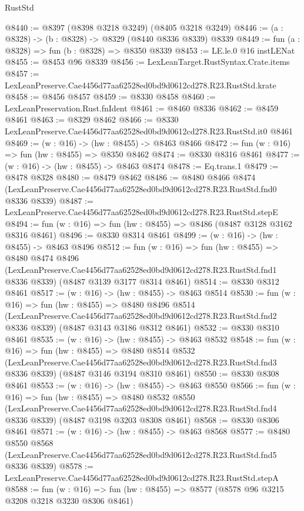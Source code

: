 \begin{lexlean}{RustStd}
\begin{coremodule}
@8440 := @8397 (@8398 @3218 @3249) (@8405 @3218 @3249)
@8446 := (a : @8328) -> (b : @8328) -> @8329 (@8440 @8336 @8339) @8339
@8449 := fun (a : @8328) => fun (b : @8328) => @8350 @8339
@8453 := LE.le.{0} @16 instLENat
@8455 := @8453 @96 @8339
@8456 := LexLeanTarget.RustSyntax.Crate.items
@8457 := LexLeanPreserve.Cae4456d77aa62528ed0bd9d0612cd278.R23.RustStd.krate
@8458 := @8456 @8457
@8459 := @8330 @8458
@8460 := LexLeanPreservation.Rust.fnIdent
@8461 := @8460 @8336
@8462 := @8459 @8461
@8463 := @8329 @8462
@8466 := @8330 LexLeanPreserve.Cae4456d77aa62528ed0bd9d0612cd278.R23.RustStd.it0 @8461
@8469 := (w : @16) -> (hw : @8455) -> @8463 @8466
@8472 := fun (w : @16) => fun (hw : @8455) => @8350 @8462
@8474 := @8330 @8316 @8461
@8477 := (w : @16) -> (hw : @8455) -> @8463 @8474
@8478 := Eq.trans.{1}
@8479 := @8478 @8328
@8480 := @8479 @8462
@8486 := @8480
    @8466
    @8474
    (LexLeanPreserve.Cae4456d77aa62528ed0bd9d0612cd278.R23.RustStd.fnd0 @8336 @8339)
@8487 := LexLeanPreserve.Cae4456d77aa62528ed0bd9d0612cd278.R23.RustStd.stepE
@8494 := fun (w : @16) => fun (hw : @8455) => @8486 (@8487 @3128 @3162 @8316 @8461)
@8496 := @8330 @8314 @8461
@8499 := (w : @16) -> (hw : @8455) -> @8463 @8496
@8512 := fun (w : @16) =>
  fun (hw : @8455) =>
  @8480
    @8474
    @8496
    (LexLeanPreserve.Cae4456d77aa62528ed0bd9d0612cd278.R23.RustStd.fnd1 @8336 @8339)
    (@8487 @3139 @3177 @8314 @8461)
@8514 := @8330 @8312 @8461
@8517 := (w : @16) -> (hw : @8455) -> @8463 @8514
@8530 := fun (w : @16) =>
  fun (hw : @8455) =>
  @8480
    @8496
    @8514
    (LexLeanPreserve.Cae4456d77aa62528ed0bd9d0612cd278.R23.RustStd.fnd2 @8336 @8339)
    (@8487 @3143 @3186 @8312 @8461)
@8532 := @8330 @8310 @8461
@8535 := (w : @16) -> (hw : @8455) -> @8463 @8532
@8548 := fun (w : @16) =>
  fun (hw : @8455) =>
  @8480
    @8514
    @8532
    (LexLeanPreserve.Cae4456d77aa62528ed0bd9d0612cd278.R23.RustStd.fnd3 @8336 @8339)
    (@8487 @3146 @3194 @8310 @8461)
@8550 := @8330 @8308 @8461
@8553 := (w : @16) -> (hw : @8455) -> @8463 @8550
@8566 := fun (w : @16) =>
  fun (hw : @8455) =>
  @8480
    @8532
    @8550
    (LexLeanPreserve.Cae4456d77aa62528ed0bd9d0612cd278.R23.RustStd.fnd4 @8336 @8339)
    (@8487 @3198 @3203 @8308 @8461)
@8568 := @8330 @8306 @8461
@8571 := (w : @16) -> (hw : @8455) -> @8463 @8568
@8577 := @8480
    @8550
    @8568
    (LexLeanPreserve.Cae4456d77aa62528ed0bd9d0612cd278.R23.RustStd.fnd5 @8336 @8339)
@8578 := LexLeanPreserve.Cae4456d77aa62528ed0bd9d0612cd278.R23.RustStd.stepA
@8588 := fun (w : @16) => fun (hw : @8455) => @8577 (@8578 @96 @3215 @3208 @3218 @3230 @8306 @8461)

\end{coremodule}
\end{lexlean}
